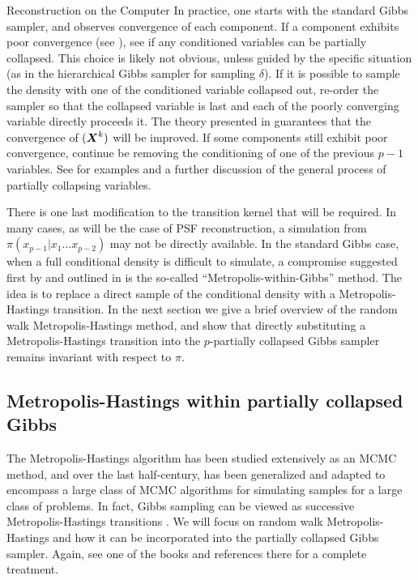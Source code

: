 \begin{chapter}{Reconstruction on the Computer}
In practice, one starts with the standard Gibbs sampler, and observes convergence of each component.
If a component exhibits poor convergence (see ), see if any conditioned variables can be partially collapsed.
This choice is likely not obvious, unless guided by the specific situation (as in the hierarchical Gibbs sampler for sampling $\delta$).
If it is possible to sample the density with one of the conditioned variable collapsed out, re-order the sampler so that the collapsed variable is last and each of the poorly converging variable directly proceeds it. 
The theory presented in \citep{van2008partially} guarantees that the convergence of $(\mbox{\boldmath$X$}^k)$ will be improved.
If some components still exhibit poor convergence, continue be removing the conditioning of one of the previous $p-1$ variables.
See \citep{van2008partially} for examples and a further discussion of the general process of partially collapsing variables.

There is one last modification to the transition kernel that will be required.
In many cases, as will be the case of PSF reconstruction, a simulation from $\pi(x_{p-1}|x_1\dots x_{p-2})$ may not be directly available.
In the standard Gibbs case, when a full conditional density is difficult to simulate, a compromise suggested first by \citep{muller1992alternatives} and outlined in \citep{robert2013monte} is the so-called ``Metropolis-within-Gibbs'' method.
The idea is to replace a direct sample of the conditional density with a Metropolis-Hastings transition. 
In the next section we give a brief overview of the random walk Metropolis-Hastings method, and show that directly substituting a Metropolis-Hastings transition into the $p$-partially collapsed Gibbs sampler remains invariant with respect to $\pi$.

\subsection{Metropolis-Hastings within partially collapsed Gibbs}
The Metropolis-Hastings algorithm \citep{metropolis1953equation} has been studied extensively as an MCMC method, and over the last half-century, has been generalized and adapted to encompass a large class of MCMC algorithms for simulating samples for a large class of problems. 
In fact, Gibbs sampling can be viewed as successive Metropolis-Hastings transitions \citep{robert2013monte}.  We will focus on random walk Metropolis-Hastings and how it can be incorporated into the partially collapsed Gibbs sampler.
Again, see one of the books \citep{calvetti2007introduction,liu2008monte,robert2013monte} and references there for a complete treatment.


\end{chapter}
